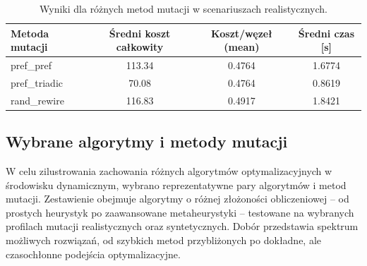 \begin{table}[H]
  \centering
  \caption{Wyniki dla różnych metod mutacji w scenariuszach realistycznych.}
  \label{tab:dyn-real-warm}
  \begin{tabular}{lccc}
    \toprule
    \textbf{Metoda mutacji} & \textbf{Średni koszt całkowity} & \textbf{Koszt/węzeł (mean)} & \textbf{Średni czas [s]} \\
    \midrule
    pref\_pref              & 113.34                          & 0.4764                      & 1.6774                   \\
    pref\_triadic           & 70.08                           & 0.4764                      & 0.8619                   \\
    rand\_rewire            & 116.83                          & 0.4917                      & 1.8421                   \\
    \bottomrule
  \end{tabular}
\end{table}

\subsection{Wybrane algorytmy i metody mutacji}
W celu zilustrowania zachowania różnych algorytmów optymalizacyjnych w środowisku dynamicznym, wybrano reprezentatywne pary algorytmów i metod mutacji. Zestawienie obejmuje algorytmy o różnej złożoności obliczeniowej -- od prostych heurystyk po zaawansowane metaheurystyki -- testowane na wybranych profilach mutacji realistycznych oraz syntetycznych. Dobór przedstawia spektrum możliwych rozwiązań, od szybkich metod przybliżonych po dokładne, ale czasochłonne podejścia optymalizacyjne.

